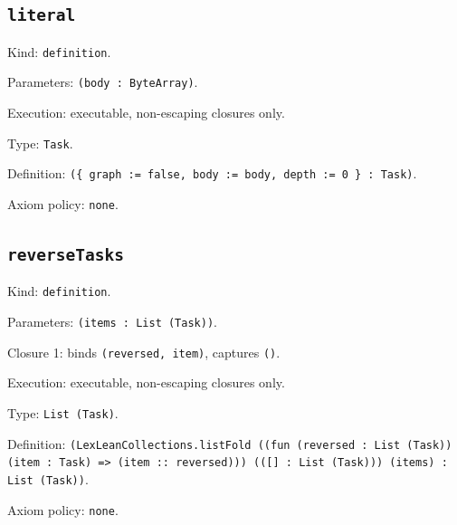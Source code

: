 \documentclass[11pt]{article}
\begin{document}
\subsection*{\texttt{literal}}
\noindent Kind: \texttt{definition}.\par
\noindent Parameters: \texttt{(body : ByteArray)}.\par
\noindent Execution: executable, non-escaping closures only.\par
\noindent Type: \texttt{Task}.\par
\noindent Definition: \texttt{(\{ graph := false, body := body, depth := 0 \} : Task)}.\par
\noindent Axiom policy: \texttt{none}.\par
\subsection*{\texttt{reverseTasks}}
\noindent Kind: \texttt{definition}.\par
\noindent Parameters: \texttt{(items : List (Task))}.\par
\noindent Closure 1: binds \texttt{(reversed, item)}, captures \texttt{()}.\par
\noindent Execution: executable, non-escaping closures only.\par
\noindent Type: \texttt{List (Task)}.\par
\noindent Definition: \texttt{(LexLeanCollections.listFold ((fun (reversed : List (Task)) (item : Task) => (item :: reversed))) (([] : List (Task))) (items) : List (Task))}.\par
\noindent Axiom policy: \texttt{none}.\par
\end{document}
